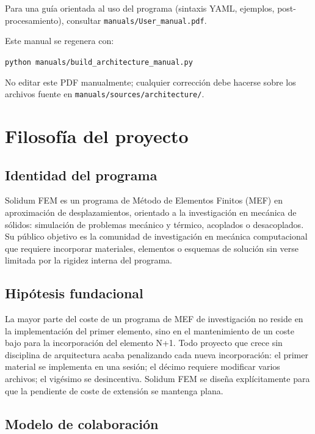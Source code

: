 \documentclass[11pt,oneside]{report}
\begin{document}
Para una guía orientada al uso del programa (sintaxis YAML, ejemplos, post-procesamiento), consultar \texttt{manuals/User\_manual.pdf}.

Este manual se regenera con:
\begin{center}\texttt{python manuals/build\_architecture\_manual.py}\end{center}

\noindent No editar este PDF manualmente; cualquier corrección debe hacerse sobre los archivos fuente en \texttt{manuals/sources/architecture/}.

\newpage
{}
\setcounter{page}{1}


\chapter{Filosofía del proyecto}
\label{cap:1}



\section{Identidad del programa}

Solidum FEM es un programa de Método de Elementos Finitos (MEF) en aproximación de desplazamientos, orientado a la investigación en mecánica de sólidos: simulación de problemas mecánico y térmico, acoplados o desacoplados. Su público objetivo es la comunidad de investigación en mecánica computacional que requiere incorporar materiales, elementos o esquemas de solución sin verse limitada por la rigidez interna del programa.

\section{Hipótesis fundacional}

La mayor parte del coste de un programa de MEF de investigación no reside en la implementación del primer elemento, sino en el mantenimiento de un coste bajo para la incorporación del elemento N+1. Todo proyecto que crece sin disciplina de arquitectura acaba penalizando cada nueva incorporación: el primer material se implementa en una sesión; el décimo requiere modificar varios archivos; el vigésimo se desincentiva. Solidum FEM se diseña explícitamente para que la pendiente de coste de extensión se mantenga plana.

\section{Modelo de colaboración}
\end{document}
